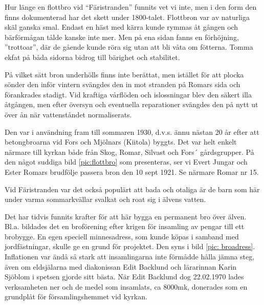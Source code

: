 Hur länge en flottbro vid ``Färistranden'' funnits vet vi inte, men i den form den finns dokumenterad har det skett under 1800-talet. Flottbron var av naturliga skäl ganska smal. Endast en häst med kärra kunde rymmas åt gången och bärförmågan tålde kanske inte mer. Men på  ena sidan fanns en förhöjning, ”trottoar”, där de gående kunde röra sig utan att bli våta om fötterna. Tomma ekfat på båda sidorna bidrog till bärighet och stabilitet.


På vilket sätt bron underhölls finns inte berättat, men istället för att plocka sönder den inför vintern svängdes den in mot stranden på Romars sida och förankrades stadigt. Vid kraftiga vårflöden och islossningar blev den säkert illa åtgången, men efter översyn och eventuella reparationer svängdes den på nytt ut över ån när vattenståndet normaliserats.

Den var i användning fram till sommaren 1930, d.v.s. ännu nästan 20 år efter att betongbroarna vid Fors och Mjölnars (Kiitola) byggts. Det var helt enkelt närmare till kyrkan både från Skog, Romar, Silvast och Fors´ gårdsgrupper. På den något suddiga bild \ref{pic:flottbro} som presenteras, ser vi Evert Jungar och Ester Romars brudfölje passera bron den 10 sept 1921. Se närmare Romar nr 15.

Vid Färistranden var det också populärt att bada och otaliga är de barn som här under varma sommarkvällar svalkat och roat sig i älvens vatten.

Det har tidvis funnits krafter för att här bygga en permanent bro över älven. Bl.a. bildades det en broförening efter krigen för insamling av pengar till ett brobygge. En egen speciell minnesadress, som kunde köpas i samband med jordfästningar, skulle ge en grund för projektet. Den syns i bild \ref{pic: broadress}. Inflationen var ändå så stark att insamlingarna inte förmådde hålla jämna steg, även om eldsjälarna med diakonissan Edit Backlund och lärarinnan Karin Sjöblom i spetsen gjorde sitt bästa. När Edit Backlund dog 22.02.1970 lades verksamheten ner och de medel som insamlats, ca 8000mk, donerades som en grundplåt för församlingshemmet vid kyrkan.



%



